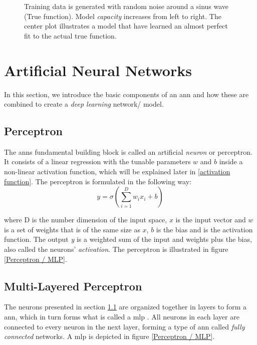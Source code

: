         \begin{figure}[H]
            \centering
            
            \caption[Over/under-fit]{Training data is generated with random noise around a sinus wave (True function). Model \textit{capacity} increases from left to right. The center plot illustrates a model that have learned an almost perfect fit to the actual true function.}
          	\medskip 
            \label{over/under fit fig}
        \end{figure}
        
        

\section{Artificial Neural Networks} \label{neural networks}
    In this section, we introduce the basic components of an \gls{ann} and how these are combined to create a \textit{deep learning} network/ model. 

    \subsection{Perceptron} \label{perceptron}
        The \gls{ann}s fundamental building block is called an artificial \textit{neuron} or perceptron. It consists of a linear regression with the tunable parameters $w$ and $b$ inside a non-linear activation function, which will be explained later in \ref{activation function}. The perceptron is formulated in the following way\cite{razavi2021deep_exp_per}:
            \begin{equation} \label{eq_perceptron}
                y = \sigma(\sum_{i=1}^{D}w_ix_i + b)
            \end{equation}
            
        where D is the number dimension of the input space, $x$ is the input vector and $w$ is a set of weights that is of the same size as $x$, $b$ is the bias and {\textsigma} is the activation function. The output \textit{y} is a weighted sum of the input and weights plus the bias, also called the neurons' \textit{activation}. The perceptron is illustrated in figure \ref{Perceptron / MLP}.
    
    \subsection{Multi-Layered Perceptron} \label{MLP}
        The neurons presented in section \ref{perceptron} are organized together in layers to form a \gls{ann}, which in turn forms what is called a \gls{mlp} \cite{razavi2021deep_exp_per}. All neurons in each layer are connected to every neuron in the next layer, forming a type of \gls{ann} called \textit{fully connected} networks. A \gls{mlp} is depicted in figure \ref{Perceptron / MLP}.
        
